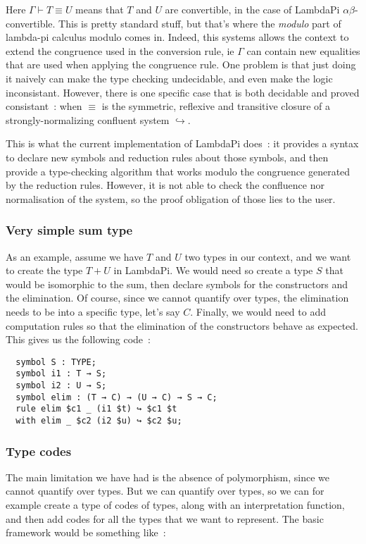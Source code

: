 Here $\Gamma\vdash T \equiv U$ means that $T$ and $U$ are convertible, in the case of LambdaPi
$\alpha\beta$-convertible. This is pretty standard stuff, but that's where the
\emph{modulo} part of lambda-pi calculus modulo comes in. Indeed, this systems
allows the context to extend the congruence used in the conversion rule, ie $\Gamma$
can contain new equalities that are used when applying the congruence rule. One
problem is that just doing it naively can make the type checking undecidable,
and even make the logic inconsistant. However, there is one specific case that
is both decidable and proved consistant~: when $\equiv$ is the symmetric, reflexive
and transitive closure of a strongly-normalizing confluent system $\hookrightarrow$.

This is what the current implementation of LambdaPi does~: it provides a syntax
to declare new symbols and reduction rules about those symbols, and then provide
a type-checking algorithm that works modulo the congruence generated by the
reduction rules. However, it is not able to check the confluence nor
normalisation of the system, so the proof obligation of those lies to the user.

\subsubsection{Very simple sum type}

As an example, assume we have $T$ and $U$ two types in our context, and we want
to create the type $T + U$ in LambdaPi. We would need so create a type $S$ that
would be isomorphic to the sum, then declare symbols for the constructors and
the elimination. Of course, since we cannot quantify over types, the elimination
needs to be into a specific type, let's say $C$.  Finally, we would need to add
computation rules so that the elimination of the constructors behave as
expected. This gives us the following code~:

\begin{lstlisting}
  symbol S : TYPE;
  symbol i1 : T → S;
  symbol i2 : U → S;
  symbol elim : (T → C) → (U → C) → S → C;
  rule elim $c1 _ (i1 $t) ↪ $c1 $t
  with elim _ $c2 (i2 $u) ↪ $c2 $u;
\end{lstlisting}

\subsubsection{Type codes}\label{codes}

The main limitation we have had is the absence of polymorphism, since we cannot
quantify over types. But we can quantify over types, so we can for example
create a type of codes of types, along with an interpretation function, and then
add codes for all the types that we want to represent. The basic framework would
be something like~:

